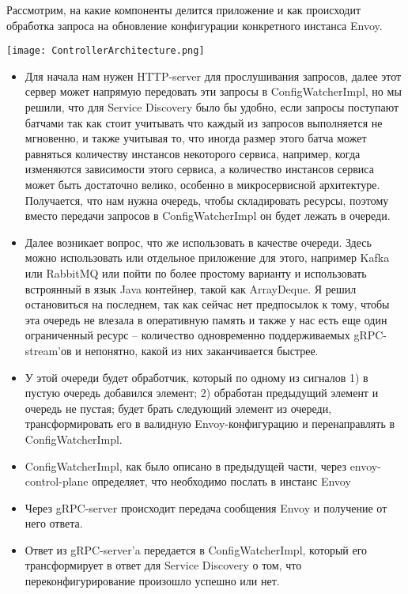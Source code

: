 Рассмотрим, на какие компоненты делится приложение и как происходит обработка запроса на обновление конфигурации конкретного инстанса Envoy.

\texttt{[image: ControllerArchitecture.png]}

\begin{itemize}
    \item Для начала нам нужен HTTP-server для прослушивания запросов, далее этот сервер может напрямую передовать эти запросы в ConfigWatcherImpl, но мы решили, что для Service Discovery было бы удобно, если запросы поступают батчами так как стоит учитывать что каждый из запросов выполняется не мгновенно, и также учитывая то, что иногда размер этого батча может равняться количеству инстансов некоторого сервиса, например, когда изменяются зависимости этого сервиса, а количество инстансов сервиса может быть достаточно велико, особенно в микросервисной архитектуре. Получается, что нам нужна очередь, чтобы складировать ресурсы, поэтому вместо передачи запросов в ConfigWatcherImpl он будет лежать в очереди.
    \item Далее возникает вопрос, что же использовать в качестве очереди. Здесь можно использовать или отдельное приложение для этого, например Kafka или RabbitMQ или пойти по более простому варианту и использовать встроянный в язык Java контейнер, такой как ArrayDeque. Я решил остановиться на последнем, так как сейчас нет предпосылок к тому, чтобы эта очередь не влезала в оперативную память и также у нас есть еще один ограниченный ресурс -- количество одновременно поддерживаемых gRPC-stream'ов и непонятно, какой из них заканчивается быстрее.
     \item У этой очереди будет обработчик, который по одному из сигналов 1) в пустую очередь добавился элемент; 2) 
 обработан предыдущий элемент и очередь не пустая; будет брать следующий элемент из очереди, трансформировать его в валидную Envoy-конфигурацию и перенаправлять в ConfigWatcherImpl. 
    \item ConfigWatcherImpl, как было описано в предыдущей части, через envoy-control-plane определяет, что необходимо послать в инстанс Envoy
    \item Через gRPC-server происходит передача сообщения Envoy и получение от него ответа.
    \item Ответ из gRPC-server'a передается в ConfigWatcherImpl, который его трансформирует в ответ для Service Discovery о том, что переконфигурирование произошло успешно или нет.
\end{itemize}


